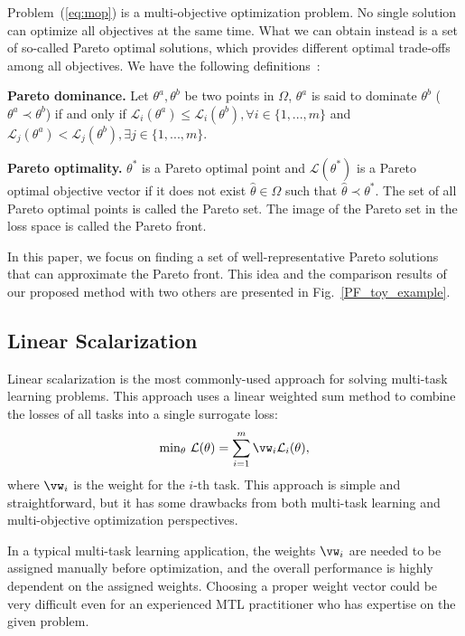 Problem~(\ref{eq:mop}) is a multi-objective optimization problem. No single solution can optimize all objectives at the same time. What we can obtain instead is a set of so-called Pareto optimal solutions,  which provides different optimal trade-offs among all objectives. We have the following definitions~\cite{zitzler1999multiobjective}:

\textbf{Pareto dominance.} Let $\theta^a,\theta^b$ be two points in $\Omega$, $\theta^a$ is said to dominate $\theta^b$ ($\theta^a \prec \theta^b$) if and only if $\mathcal{L}_i(\theta^a) \leq \mathcal{L}_i(\theta^b), \forall i \in \{1,...,m\}$ and $\mathcal{L}_j(\theta^a) < \mathcal{L}_j(\theta^b), \exists j \in \{1,...,m\}$.

\textbf{Pareto optimality.} $\theta^{\ast}$ is a Pareto optimal point and $\mathcal{L}(\theta^{\ast})$ is a Pareto optimal objective vector if it does not exist $\hat \theta \in  \Omega$ such that $\hat \theta \prec \theta^{\ast}$.
The set of all Pareto optimal points is called the Pareto set. The image of the Pareto set in the loss space is called the Pareto front.

In this paper, we focus on finding a set of well-representative Pareto solutions that can approximate the Pareto front. This idea and the comparison results of our proposed method with two others are presented in Fig.~\ref{PF_toy_example}.

\subsection{Linear Scalarization}

Linear scalarization is the most commonly-used approach for solving multi-task learning problems. This approach uses a linear weighted sum method to combine the losses of all tasks into a single surrogate loss:	
\begin{eqnarray}\label{eq:sum}
\mathrm{min}_{\theta} \ \mathcal{L}(\theta) = \sum_{i=1}^{m}\vw_i \mathcal{L}_i(\theta),
\end{eqnarray}
where $\vw_i$ is the weight for the $i$-th task. This approach is simple and straightforward, but it has some drawbacks from both multi-task learning and multi-objective optimization perspectives.

In a typical multi-task learning application, the weights $\vw_i$ are needed to be assigned manually before optimization, and the overall performance is highly dependent on the assigned weights. Choosing a proper weight vector could be very difficult even for an experienced MTL practitioner who has expertise on the given problem.

